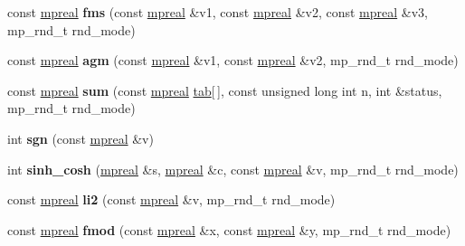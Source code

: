 \begin{DoxyCompactItemize}
const \hyperlink{classmpfr_1_1mpreal}{mpreal} {\bfseries fms} (const \hyperlink{classmpfr_1_1mpreal}{mpreal} \&v1, const \hyperlink{classmpfr_1_1mpreal}{mpreal} \&v2, const \hyperlink{classmpfr_1_1mpreal}{mpreal} \&v3, mp\+\_\+rnd\+\_\+t rnd\+\_\+mode)
\item 
\mbox{\label{classmpfr_1_1mpreal_a8de94beb7340e414f4784033e7f75c1c}} 
const \hyperlink{classmpfr_1_1mpreal}{mpreal} {\bfseries agm} (const \hyperlink{classmpfr_1_1mpreal}{mpreal} \&v1, const \hyperlink{classmpfr_1_1mpreal}{mpreal} \&v2, mp\+\_\+rnd\+\_\+t rnd\+\_\+mode)
\item 
\mbox{\label{classmpfr_1_1mpreal_abe01a8ce394953847c723c001ccb5c7f}} 
const \hyperlink{classmpfr_1_1mpreal}{mpreal} {\bfseries sum} (const \hyperlink{classmpfr_1_1mpreal}{mpreal} \hyperlink{structtab}{tab}\mbox{[}$\,$\mbox{]}, const unsigned long int n, int \&status, mp\+\_\+rnd\+\_\+t rnd\+\_\+mode)
\item 
\mbox{\label{classmpfr_1_1mpreal_a6d0d38004b8d7c4fcbaa5df8cbc7178c}} 
int {\bfseries sgn} (const \hyperlink{classmpfr_1_1mpreal}{mpreal} \&v)
\item 
\mbox{\label{classmpfr_1_1mpreal_aa5a869f108d3bc294cc59972aaa7102b}} 
int {\bfseries sinh\+\_\+cosh} (\hyperlink{classmpfr_1_1mpreal}{mpreal} \&s, \hyperlink{classmpfr_1_1mpreal}{mpreal} \&c, const \hyperlink{classmpfr_1_1mpreal}{mpreal} \&v, mp\+\_\+rnd\+\_\+t rnd\+\_\+mode)
\item 
\mbox{\label{classmpfr_1_1mpreal_a0eb0e188ac7b0c538c1517f754de5eed}} 
const \hyperlink{classmpfr_1_1mpreal}{mpreal} {\bfseries li2} (const \hyperlink{classmpfr_1_1mpreal}{mpreal} \&v, mp\+\_\+rnd\+\_\+t rnd\+\_\+mode)
\item 
\mbox{\label{classmpfr_1_1mpreal_a4c1a7ff6327558cf2fb2101f8c4ff2a2}} 
const \hyperlink{classmpfr_1_1mpreal}{mpreal} {\bfseries fmod} (const \hyperlink{classmpfr_1_1mpreal}{mpreal} \&x, const \hyperlink{classmpfr_1_1mpreal}{mpreal} \&y, mp\+\_\+rnd\+\_\+t rnd\+\_\+mode)
\item 
\mbox{\label{classmpfr_1_1mpreal_a8396cfa2553c7288137831e3237fcda5}} 

\end{DoxyCompactItemize}
